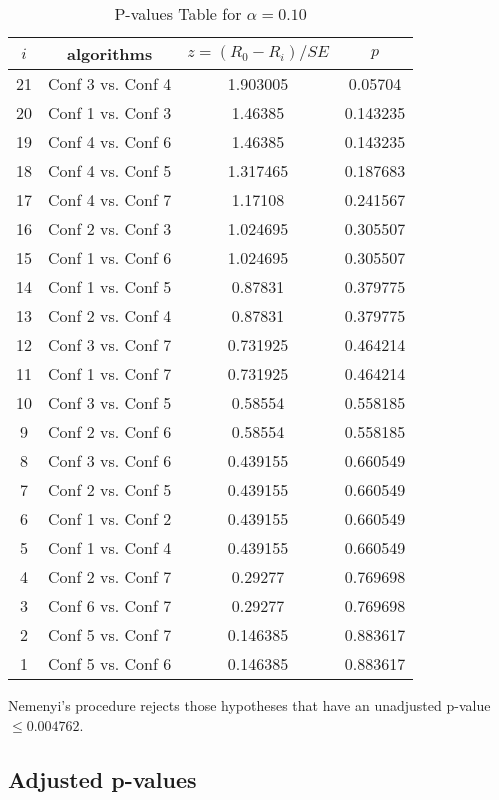 \documentclass[a4paper,10pt]{article}
\begin{document}
\begin{landscape}
\begin{table}[!htp]
\centering\scriptsize
\begin{tabular}{cccc}
$i$&algorithms&$z=(R_0 - R_i)/SE$&$p$\\
\hline21&Conf 3 vs. Conf 4&1.903005&0.05704\\
20&Conf 1 vs. Conf 3&1.46385&0.143235\\
19&Conf 4 vs. Conf 6&1.46385&0.143235\\
18&Conf 4 vs. Conf 5&1.317465&0.187683\\
17&Conf 4 vs. Conf 7&1.17108&0.241567\\
16&Conf 2 vs. Conf 3&1.024695&0.305507\\
15&Conf 1 vs. Conf 6&1.024695&0.305507\\
14&Conf 1 vs. Conf 5&0.87831&0.379775\\
13&Conf 2 vs. Conf 4&0.87831&0.379775\\
12&Conf 3 vs. Conf 7&0.731925&0.464214\\
11&Conf 1 vs. Conf 7&0.731925&0.464214\\
10&Conf 3 vs. Conf 5&0.58554&0.558185\\
9&Conf 2 vs. Conf 6&0.58554&0.558185\\
8&Conf 3 vs. Conf 6&0.439155&0.660549\\
7&Conf 2 vs. Conf 5&0.439155&0.660549\\
6&Conf 1 vs. Conf 2&0.439155&0.660549\\
5&Conf 1 vs. Conf 4&0.439155&0.660549\\
4&Conf 2 vs. Conf 7&0.29277&0.769698\\
3&Conf 6 vs. Conf 7&0.29277&0.769698\\
2&Conf 5 vs. Conf 7&0.146385&0.883617\\
1&Conf 5 vs. Conf 6&0.146385&0.883617\\
\hline
\end{tabular}
\caption{P-values Table for $\alpha=0.10$}
\end{table}Nemenyi's procedure rejects those hypotheses that have an unadjusted p-value $\le0.004762$.

\pagebreak

\subsection{Adjusted p-values}


\end{landscape}
\end{document}
